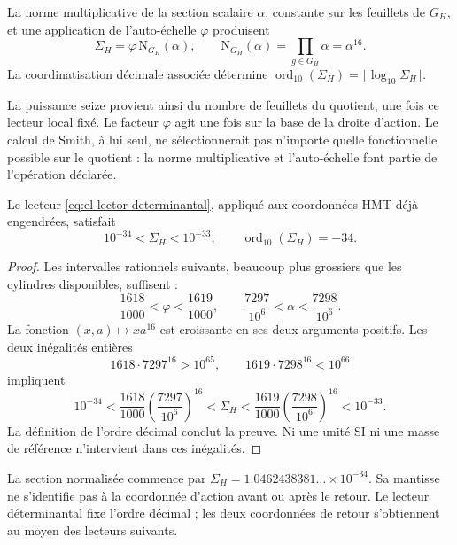 \begin{definition}
La norme multiplicative de la section scalaire \(\alpha\), constante
sur les feuillets de \(G_H\), et une application de l'auto-échelle
\(\varphi\) produisent
\begin{equation}
 \Sigma_H=\varphi\,\mathrm N_{G_H}(\alpha),\qquad
 \mathrm N_{G_H}(\alpha)=\prod_{g\in G_H}\alpha=\alpha^{16}.
 \label{eq:el-lector-determinantal}
\end{equation}
La coordinatisation décimale associée détermine
\(\operatorname{ord}_{10}(\Sigma_H)=\lfloor\log_{10}\Sigma_H\rfloor\).
\end{definition}

La puissance seize provient ainsi du nombre de feuillets du quotient, une
fois ce lecteur local fixé. Le facteur \(\varphi\) agit une fois sur
la base de la droite d'action. Le calcul de Smith, à lui seul, ne
sélectionnerait pas n'importe quelle fonctionnelle possible sur le quotient : la norme
multiplicative et l'auto-échelle font partie de l'opération déclarée.

\begin{theorem}
Le lecteur \eqref{eq:el-lector-determinantal}, appliqué aux coordonnées
HMT déjà engendrées, satisfait
\begin{equation}
 10^{-34}<\Sigma_H<10^{-33},\qquad
 \operatorname{ord}_{10}(\Sigma_H)=-34.
 \label{eq:el-decada}
\end{equation}
\end{theorem}
\begin{proof}
Les intervalles rationnels suivants, beaucoup plus grossiers que les cylindres
disponibles, suffisent :
\[
 \frac{1618}{1000}<\varphi<\frac{1619}{1000},\qquad
 \frac{7297}{10^6}<\alpha<\frac{7298}{10^6}.
\]
La fonction \((x,a)\mapsto xa^{16}\) est croissante en ses deux arguments
positifs. Les deux inégalités entières
\[
 1618\cdot7297^{16}>10^{65},\qquad
 1619\cdot7298^{16}<10^{66}
\]
impliquent
\[
 10^{-34}
 <\frac{1618}{1000}\left(\frac{7297}{10^6}\right)^{16}
 <\Sigma_H
 <\frac{1619}{1000}\left(\frac{7298}{10^6}\right)^{16}
 <10^{-33}.
\]
La définition de l'ordre décimal conclut la preuve. Ni une
unité SI ni une masse de référence n'intervient dans ces inégalités.
\end{proof}

La section normalisée commence par
\(\Sigma_H=1.0462438381\ldots\times10^{-34}\). Sa mantisse ne
s'identifie pas à la coordonnée d'action avant ou après le retour.
Le lecteur déterminantal fixe l'ordre décimal ; les deux coordonnées de
retour s'obtiennent au moyen des lecteurs suivants.


